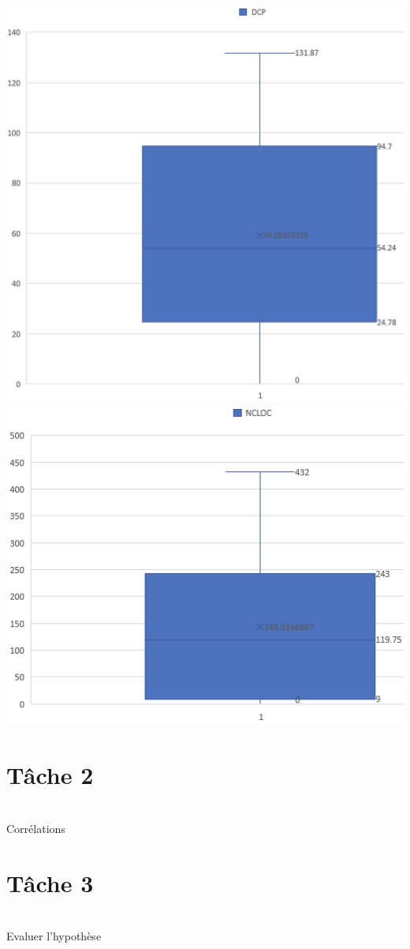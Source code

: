 \documentclass{article}
\begin{document}
\includegraphics[scale=0.5]{DCP.png}\\
\includegraphics[scale=0.6]{NCLOC.png}


\section*{Tâche 2}\\
Corrélations\\

\section*{Tâche 3}\\
Evaluer l’hypothèse
\end{document}
